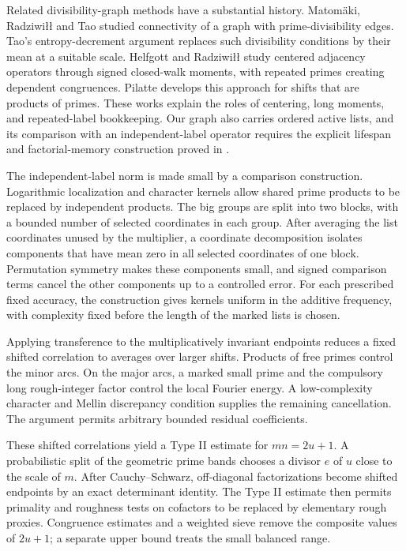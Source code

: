 Related divisibility-graph methods have a substantial history.
Matom\"aki, Radziwi\l\l{} and Tao
\cite[Theorem~5.1]{MatomakiRadziwillTao2016} studied connectivity
of a graph with prime-divisibility edges. Tao's entropy-decrement
argument \cite{Tao2016} replaces such divisibility conditions by
their mean at a suitable scale. Helfgott and Radziwi\l\l{}
\cite[Section~1.5]{HelfgottRadziwill2021} study centered adjacency
operators through signed closed-walk moments, with repeated primes
creating dependent congruences. Pilatte
\cite[Theorem~2.4 and Section~5]{Pilatte2026} develops this approach
for shifts that are products of primes. These works explain the
roles of centering, long moments, and repeated-label bookkeeping.
Our graph also carries ordered active lists, and its comparison
with an independent-label operator requires the explicit lifespan
and factorial-memory construction proved in .

The independent-label norm is made small by a comparison construction.
Logarithmic localization and character kernels allow shared prime
products to be replaced by independent products. The big groups are
split into two blocks, with a bounded number of selected coordinates
in each group. After averaging the list coordinates unused by the
multiplier, a coordinate decomposition isolates components that have
mean zero in all selected coordinates of one block. Permutation
symmetry makes these components small, and signed comparison terms
cancel the other components up to a controlled error. For each
prescribed fixed accuracy, the construction gives kernels uniform in
the additive frequency, with complexity fixed
before the length of the marked lists is chosen.

Applying transference to the multiplicatively invariant endpoints
reduces a fixed shifted correlation to averages over larger shifts.
Products of free primes control the minor arcs. On the major arcs,
a marked small prime and the compulsory long rough-integer factor
control the local Fourier energy. A low-complexity character and
Mellin discrepancy condition supplies the remaining cancellation.
The argument permits arbitrary bounded residual coefficients.

These shifted correlations yield a Type II estimate for
$mn=2u+1$. A probabilistic split of the geometric prime bands chooses
a divisor $e$ of $u$ close to the scale of $m$. After Cauchy--Schwarz,
off-diagonal factorizations become shifted endpoints by an exact
determinant identity. The Type II estimate then permits primality
and roughness tests on cofactors to be replaced by elementary rough
proxies. Congruence estimates and a weighted sieve remove the
composite values of $2u+1$; a separate upper bound treats the small
balanced range.


